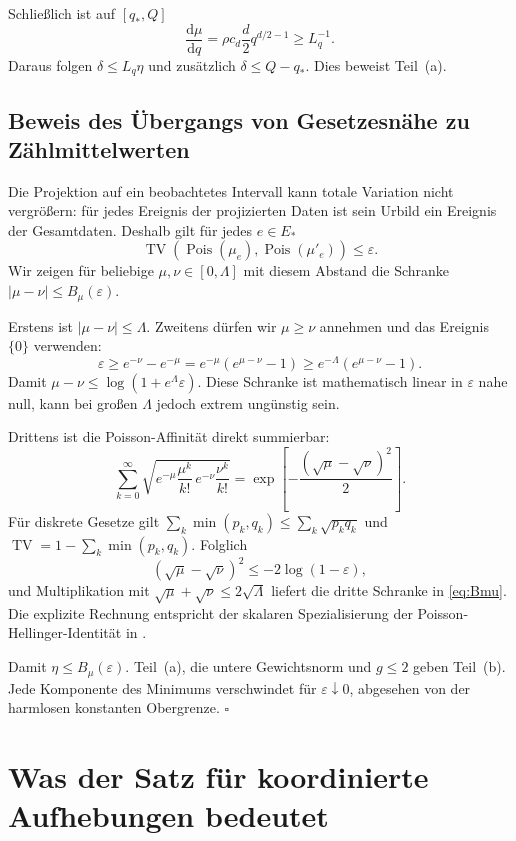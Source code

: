 \documentclass[11pt,a4paper]{article}
\theoremstyle{definition}\newtheorem{definition}{Definition}
\theoremstyle{remark}\newtheorem*{remark}{Bemerkung}
\newcommand{\TV}{\operatorname{TV}}
\newcommand{\Pois}{\operatorname{Pois}}
\newcommand{\dd}{\mathrm{d}}
\begin{document}
Schließlich ist auf $[q_*,Q]$
\[
 \frac{\dd\mu}{\dd q}=\rho c_d\frac d2q^{d/2-1}
 \geq L_q^{-1}.
\]
Daraus folgen $\delta\leq L_q\eta$ und zusätzlich $\delta\leq Q-q_*$. Dies beweist Teil~(a).

\subsection{Beweis des Übergangs von Gesetzesnähe zu Zählmittelwerten}

Die Projektion auf ein beobachtetes Intervall kann totale Variation nicht vergrößern: für jedes Ereignis der projizierten Daten ist sein Urbild ein Ereignis der Gesamtdaten. Deshalb gilt für jedes $e\in E_*$
\[
 \TV(\Pois(\mu_e),\Pois(\mu'_e))\leq\varepsilon.
\]
Wir zeigen für beliebige $\mu,\nu\in[0,\Lambda]$ mit diesem Abstand die Schranke $|\mu-\nu|\leq B_\mu(\varepsilon)$.

Erstens ist $|\mu-\nu|\leq\Lambda$. Zweitens dürfen wir $\mu\geq\nu$ annehmen und das Ereignis $\{0\}$ verwenden:
\[
 \varepsilon\geq e^{-\nu}-e^{-\mu}
   =e^{-\mu}(e^{\mu-\nu}-1)
   \geq e^{-\Lambda}(e^{\mu-\nu}-1).
\]
Damit $\mu-\nu\leq\log(1+e^\Lambda\varepsilon)$. Diese Schranke ist mathematisch linear in $\varepsilon$ nahe null, kann bei großen $\Lambda$ jedoch extrem ungünstig sein.

Drittens ist die Poisson-Affinität direkt summierbar:
\begin{equation}\label{eq:affinity}
 \sum_{k=0}^\infty
 \sqrt{e^{-\mu}\frac{\mu^k}{k!}\,
       e^{-\nu}\frac{\nu^k}{k!}}
 =\exp\!\left[-\frac{(\sqrt\mu-\sqrt\nu)^2}{2}\right].
\end{equation}
Für diskrete Gesetze gilt $\sum_k\min(p_k,q_k)\leq\sum_k\sqrt{p_kq_k}$ und $\TV=1-\sum_k\min(p_k,q_k)$. Folglich
\[
 (\sqrt\mu-\sqrt\nu)^2\leq-2\log(1-\varepsilon),
\]
und Multiplikation mit $\sqrt\mu+\sqrt\nu\leq2\sqrt\Lambda$ liefert die dritte Schranke in \eqref{eq:Bmu}. Die explizite Rechnung entspricht der skalaren Spezialisierung der Poisson-Hellinger-Identität in \cite{leskela}.

Damit $\eta\leq B_\mu(\varepsilon)$. Teil~(a), die untere Gewichtsnorm und $g\leq2$ geben Teil~(b). Jede Komponente des Minimums verschwindet für $\varepsilon\downarrow0$, abgesehen von der harmlosen konstanten Obergrenze. \hfill$\square$

\section{Was der Satz für koordinierte Aufhebungen bedeutet}
\end{document}
